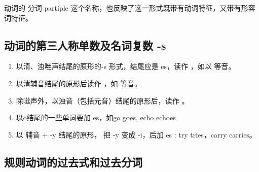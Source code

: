 动词的 分词 partiple 这个名称，也反映了这一形式既带有动词特征，又带有形容词特征。


\subsection{动词的第三人称单数及名词复数 -s }

\begin{enumerate}
\item 以清、浊咝声结尾的原形的-s 形式，结尾应是 es，读作  ，如以
   等音。
\item 以清辅音结尾的原形后读作 ，如  等音。
\item 除咝声外，以浊音（包括元音）结尾的原形后，读作 。
\item 以o结尾的一些单词要加 es，如go  \Rightarrow goes, echo  \Rightarrow echoes
\item 以 辅音 + -y 结尾的原形， 把 -y 变成 -i，后加 es : try \Rightarrow tries，carry  \Rightarrow carries。
\end{enumerate}

\subsection{规则动词的过去式和过去分词}

